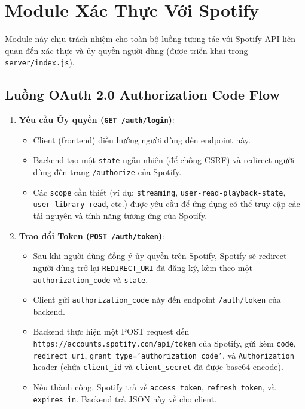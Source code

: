 \documentclass[12pt,a4paper]{article}
\begin{document}
\section{Module Xác Thực Với Spotify}
\label{sec:spotify-auth}

Module này chịu trách nhiệm cho toàn bộ luồng tương tác với Spotify API liên quan đến xác thực và ủy quyền người dùng (được triển khai trong \texttt{server/index.js}).

\subsection{Luồng OAuth 2.0 Authorization Code Flow}
\label{subsec:oauth-flow}

\begin{enumerate}
    \item \textbf{Yêu cầu Ủy quyền (\texttt{GET /auth/login})}:
        \begin{itemize}
            \item Client (frontend) điều hướng người dùng đến endpoint này.
            \item Backend tạo một \texttt{state} ngẫu nhiên (để chống CSRF) và redirect người dùng đến trang \texttt{/authorize} của Spotify.
            \item Các \texttt{scope} cần thiết (ví dụ: \texttt{streaming}, \texttt{user-read-playback-state}, \texttt{user-library-read}, etc.) được yêu cầu để ứng dụng có thể truy cập các tài nguyên và tính năng tương ứng của Spotify.
        \end{itemize}
    
    \item \textbf{Trao đổi Token (\texttt{POST /auth/token})}:
        \begin{itemize}
            \item Sau khi người dùng đồng ý ủy quyền trên Spotify, Spotify sẽ redirect người dùng trở lại \texttt{REDIRECT\_URI} đã đăng ký, kèm theo một \texttt{authorization\_code} và \texttt{state}.
            \item Client gửi \texttt{authorization\_code} này đến endpoint \texttt{/auth/token} của backend.
            \item Backend thực hiện một POST request đến \texttt{https://accounts.spotify.com/api/token} của Spotify, gửi kèm \texttt{code}, \texttt{redirect\_uri}, \texttt{grant\_type='authorization\_code'}, và \texttt{Authorization} header (chứa \texttt{client\_id} và \texttt{client\_secret} đã được base64 encode).
            \item Nếu thành công, Spotify trả về \texttt{access\_token}, \texttt{refresh\_token}, và \texttt{expires\_in}. Backend trả JSON này về cho client.
        \end{itemize}
        

\end{enumerate}
\end{document}
